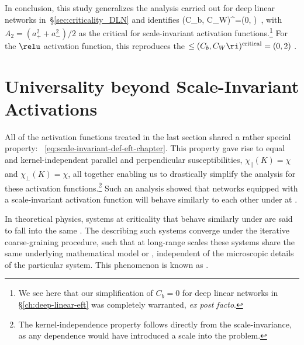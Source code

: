 In conclusion, this study generalizes the analysis carried out for deep linear networks in~\S\ref{sec:criticality_DLN} and identifies
\be\label{eq:criticality_scale_invariant}
\le(C_b, C_W\ri)^{}=\le(0, \ri)\,  ,
\ee
with $A_2= (a_+^2+a_-^2)/2$ as the critical  for scale-invariant activation functions.\footnote{We see here that our simplification of $C_b =0$ for deep linear networks in \S\ref{ch:deep-linear-eft} was completely warranted, \emph{ex post facto}.} For the $\relu$ activation function, this reproduces the  $\le(C_b, C_W\ri)^{\text{critical}}= (0,2)$ \cite{he2015delving}.










\section{Universality beyond Scale-Invariant Activations}\label{sec:non-scale-invariant-eft}
All of the activation functions treated in the last section shared a rather special property: ~\eqref{eq:scale-invariant-def-eft-chapter}.
This property 
gave rise to equal and kernel-independent parallel and perpendicular susceptibilities, $\chi_\parallel(K)=\chi$ and  $\chi_\perp(K)=\chi$, all together enabling us to drastically simplify the  analysis for these activation functions.\footnote{The kernel-independence property follows directly from the scale-invariance, as any dependence would have introduced a scale into the problem.}
Such an analysis showed that networks equipped with a scale-invariant activation function will behave similarly to each other under  at .

In theoretical physics, systems at criticality that behave similarly under  are said to fall into the same . The  describing such systems converge under the iterative coarse-graining procedure, such that at long-range scales these systems share the same underlying mathematical model or ,  independent of the microscopic details of the particular system. This phenomenon is known as  \cite{Kadanoff:1971pc}. 



